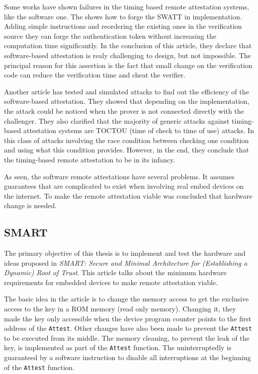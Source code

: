 Some works have shown failures in the timing based remote attestation systems, like the software one. The \cite{Castelluccia:2009:DSA:1653662.1653711} shows how to forge the SWATT in implementation. Adding simple instructions and reordering the existing ones in the verification source they can forge the authentication token without increasing the computation time significantly. In the conclusion of this article, they declare that software-based attestation is realy challenging to design, but not impossible. The principal reason for this assertion is the fact that small change on the verification code can reduce the verification time and cheat the verifier.

Another article\cite{generic_timming_bug} has tested and simulated attacks to find out the efficiency of the software-based attestation. They showed that depending on the implementation, the attack could be noticed when the prover is not connected directly with the challenger. They also clarified that the majority of generic attacks against timing-based attestation systems are
TOCTOU (time of check to time of use) attacks.  In this class of attacks involving the race condition between checking one condition and using what this condition provides. However, in the end, they conclude that the timing-based remote attestation to be in its infancy.

As seen, the software remote attestations have several problems. It assumes guarantees that are complicated to exist when involving real embed devices on the internet. To make the remote attestation viable was concluded that hardware change is needed. 

\subsection{SMART}

The primary objective of this thesis is to implement and test the hardware and ideas proposed in \textit{SMART: Secure and Minimal Architecture for (Establishing a Dynamic) Root of Trust}\cite{smart}. This article talks about the minimum hardware requirements for embedded devices to make remote attestation viable. 

The basic idea in the article is to change the memory access to get the exclusive access to the key in a ROM memory (read only memory). Changing it, they made the key only accessible when the device program counter points to the first address of the \verb|Attest|. Other changes have also been made to prevent the \verb|Attest| to be executed from its middle. The memory cleaning, to prevent the leak of the key, is implemented as part of the \verb|Attest| function. The uninterruptedly is guaranteed by a software instruction to disable all interruptions at the beginning of the \verb|Attest| function.

